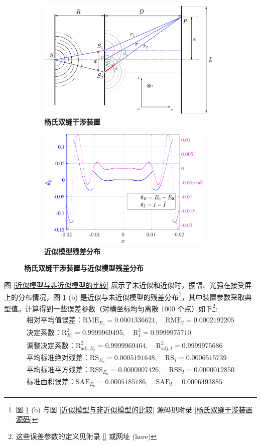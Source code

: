 \documentclass[UTF8]{report}
\theoremstyle{MyLineTheoremStyle} %
\theoremstyle{MyBlockTheoremStyle} %
\theoremstyle{MySubsubsectionStyle} %
\begin{document}
\begin{figure}[H]\centering
    \begin{subfigure}[t]{0.52\columnwidth}\centering
        \includegraphics[height=165pt]{assets/3/杨双.pdf}
        \caption{\bfseries 杨氏双缝干涉装置 }
    \end{subfigure}\begin{subfigure}[t]{0.48\columnwidth}\centering
        \includegraphics[height=165pt]{assets/3/杨残差.pdf}
        \caption{\bfseries 近似模型残差分布 }
    \end{subfigure}
    \caption{\bfseries 杨氏双缝干涉装置与近似模型残差分布 }\label{杨氏双缝干涉装置}
\end{figure}

图 \ref{近似模型与非近似模型的比较} 展示了未近似和近似时，振幅、光强在接受屏上的分布情况，图 \ref{杨氏双缝干涉装置} (b) 是近似与未近似模型的残差分布\footnote{图 \ref{杨氏双缝干涉装置} (b) 与图 \ref{近似模型与非近似模型的比较} 源码见附录 \ref{杨氏双缝干涉装置 源码}}，其中装置参数采取典型值。计算得到一些误差参数（对横坐标均匀离散 1000 个点）如下\footnote{这些误差参数的定义见附录 \ref{} 或网址 (here)}: 
\begin{gather}
\begin{matrix}
    \text{相对平均值误差：} \text{RME}_{E_0} =  0.0001336621,\quad \text{RME}_{I} = 0.0002192205 \\
    \text{决定系数：} \text{R}^2_{E_0} =  0.9999969495,\quad \text{R}^2_{I} = 0.9999975710 \\
    \text{调整决定系数：} \text{R}^2_{\text{adj}, E_0} = 0.9999969464,\quad \text{R}^2_{\text{adj}, I} = 0.9999975686 \\
    \text{平均标准绝对残差：} \text{RS}_{E_0} = 0.0005191648,\quad \text{RS}_{I} = 0.0006515739\\
    \text{平均标准平方残差：} \text{RSS}_{E_0} = 0.0000007426 ,\quad \text{RSS}_{I} = 0.0000012850  \\ 
    \text{标准面积误差：} \text{SAE}_{E_0} = 0.0005185186 ,\quad \text{SAE}_{I} = 0.0006493885
\end{matrix}
\end{gather}
\end{document}
